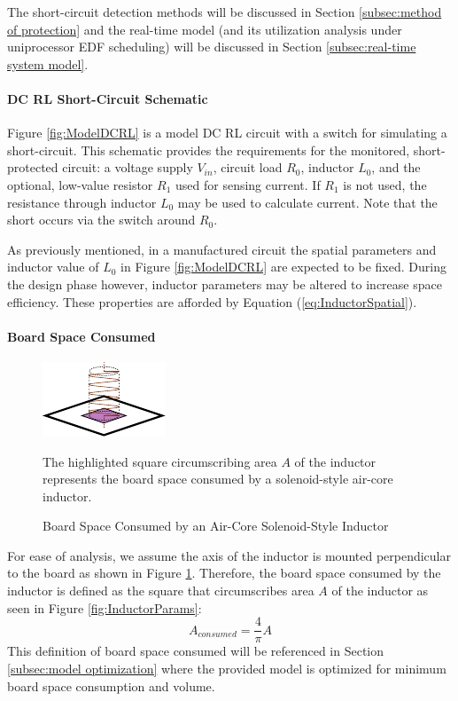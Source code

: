 The short-circuit detection methods will be discussed in Section \ref{subsec:method of protection} and the real-time model (and its utilization analysis under uniprocessor EDF scheduling) will be discussed in Section \ref{subsec:real-time system model}.

\paragraph{DC RL Short-Circuit Schematic}
Figure \ref{fig:ModelDCRL} is a model DC RL circuit with a switch for simulating a short-circuit. This schematic provides the requirements for the monitored, short-protected circuit: a voltage supply $V_{in}$, circuit load $R_{0}$, inductor $L_{0}$, and the optional, low-value resistor $R_{1}$ used for sensing current. If $R_{1}$ is not used, the resistance through inductor $L_{0}$ may be used to calculate current. Note that the short occurs via the switch around $R_{0}$.

As previously mentioned, in a manufactured circuit the spatial parameters and inductor value of $L_0$ in Figure \ref{fig:ModelDCRL} are expected to be fixed. During the design phase however, inductor parameters may be altered to increase space efficiency. These properties are afforded by Equation (\ref{eq:InductorSpatial}).

\paragraph{Board Space Consumed}
\begin{figure}
    \centering
    \includegraphics[scale=2.0]{fig/Inductor_Perpendicular_Mount.pdf}
    \caption{Board Space Consumed by an Air-Core Solenoid-Style Inductor} The highlighted square circumscribing area $A$ of the inductor represents the board space consumed by a solenoid-style air-core inductor.
    \label{fig:BoardSpaceConsumed}
\end{figure}
For ease of analysis, we assume the axis of the inductor is mounted perpendicular to the board as shown in Figure \ref{fig:BoardSpaceConsumed}. Therefore, the board space consumed by the inductor is defined as the square that circumscribes area $A$ of the inductor as seen in Figure \ref{fig:InductorParams}:
\begin{equation}\label{eq:AreaConsumed}
A_{consumed} = \frac{4}{\pi}A
\end{equation}
This definition of board space consumed will be referenced in Section \ref{subsec:model optimization} where the provided model is optimized for minimum board space consumption and volume.
